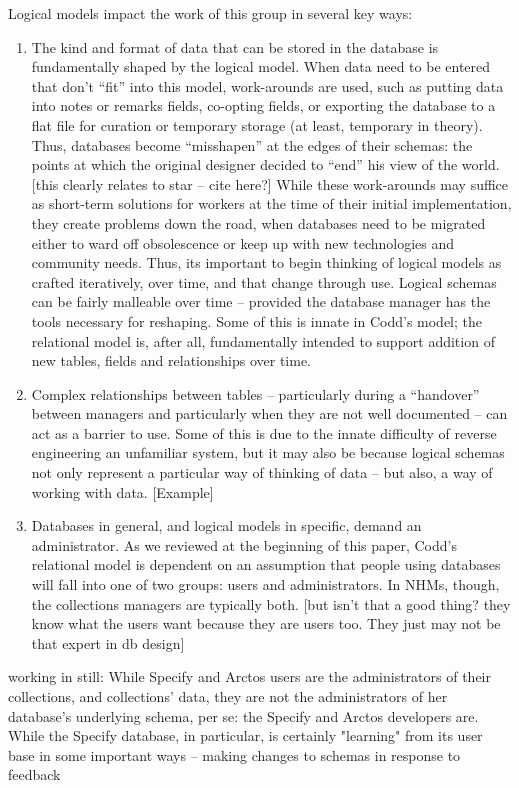 Logical models impact the work of this group in several key ways: 
\begin{enumerate}
\item The kind and format of data that can be stored in the database is fundamentally shaped by the logical model. When data need to be entered that don’t “fit” into this model, work-arounds are used, such as putting data into notes or remarks fields, co-opting fields, or exporting the database to a flat file for curation or temporary storage (at least, temporary in theory). Thus, databases become “misshapen” at the edges of their schemas: the points at which the original designer decided to “end” his view of the world. [this clearly relates to star – cite here?] While these work-arounds may suffice as short-term solutions for workers at the time of their initial implementation, they create problems down the road, when databases need to be migrated either to ward off obsolescence or keep up with new technologies and community needs. Thus, its important to begin thinking of logical models as crafted iteratively, over time, and that change through use. Logical schemas can be fairly malleable over time – provided the database manager has the tools necessary for reshaping. Some of this is innate in Codd’s model; the relational model is, after all, fundamentally intended to support addition of new tables, fields and relationships over time. 
\item Complex relationships between tables – particularly during a “handover” between managers and particularly when they are not well documented – can act as a barrier to use. Some of this is due to the innate difficulty of reverse engineering an unfamiliar system, but it may also be because logical schemas not only represent a particular way of thinking of data – but also, a way of working with data. [Example]
\item Databases in general, and logical models in specific, demand an administrator. As we reviewed at the beginning of this paper, Codd’s relational model is dependent on an assumption that people using databases will fall into one of two groups: users and administrators. In NHMs, though, the collections managers are typically both. [but isn't that a good thing? they know what the users  want because they are users too. They just may not be that expert in db design]

\end{enumerate}

working in still:
 While Specify and Arctos users are the administrators of their collections, and collections’ data, they are not the administrators of her database's underlying schema, per se: the Specify and Arctos developers are.  While the Specify database, in particular, is certainly "learning" from its user base in some important ways – making changes to schemas in response to feedback   


